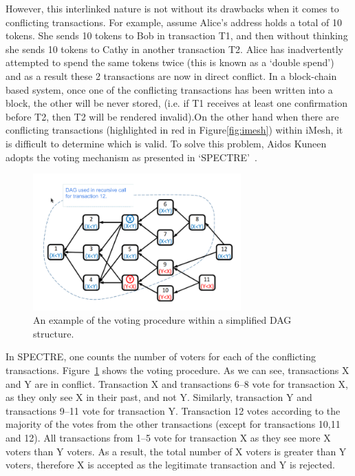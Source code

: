 \documentclass[a4paper,10pt,twocolumn]{article}
\begin{document}
However, this interlinked nature is not without its drawbacks when it comes to conflicting transactions. For example, assume Alice's 
address holds a total of 10 tokens. She sends 10 tokens to Bob in transaction T1, and then without thinking she sends 10 tokens to Cathy 
in another transaction T2. Alice has inadvertently attempted to spend the same tokens twice (this is known as a `double spend')
and as a result these 2 transactions are now in direct conflict. In a block-chain based system, once one of the conflicting transactions 
has been written into a block, the other will be never stored, (i.e. if T1 receives at least one confirmation before T2, then T2 will be 
rendered invalid).On the other hand when there are conflicting transactions (highlighted in red in Figure\ref{fig:imesh}) within iMesh, 
it is difficult to determine which is valid. To solve this problem, Aidos Kuneen adopts the voting mechanism as presented in 
`SPECTRE'~\cite{spectre}.

\begin{figure}[ht]
	\begin{center}
	\includegraphics[width=80mm]{spectre.png}
	  \caption{An example of the voting procedure within a simplified DAG structure.}
    \label{fig:spectre}
	\end{center}
 \end{figure}

 In SPECTRE, one counts the number of voters for each of the conflicting transactions. Figure~\ref{fig:spectre} shows the voting 
 procedure. As we can see, transactions X and Y are in conflict. Transaction X and transactions 6--8 vote for transaction X, as they 
 only see X in their past, and not Y. Similarly, transaction Y and transactions 9--11 vote for transaction Y. Transaction 12 votes 
 according to the majority of the votes from the other transactions (except for transactions 10,11 and 12). All transactions from 1--5 
 vote for transaction X as they see more X voters than Y voters. As a result, the total number of X voters is greater than Y voters, 
 therefore X is accepted as the legitimate transaction and Y is rejected. 
\end{document}
